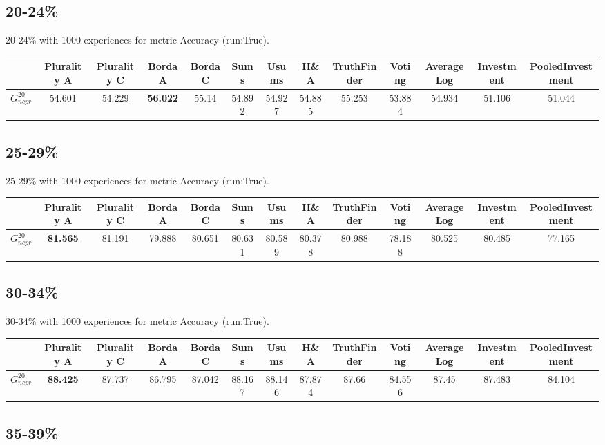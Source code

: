\documentclass{article}
\newcommand{\graph}[2]{$G_{#1}^{#2}$}
\begin{document}
\subsection{20-24\%}

20-24\% with 1000 experiences for metric Accuracy (run:True).

\noindent\begin{tabular}{|l|c|c|c|c|c|c|c|c|c|c|c|c|}
\hline
& Plurality A& Plurality C& Borda A& Borda C& Sums& Usums& H\&A& TruthFinder& Voting& AverageLog& Investment& PooledInvestment\\
\hline
\graph{ncpr}{20} &54.601&54.229&\textbf{56.022}&55.14&54.892&54.927&54.885&55.253&53.884&54.934&51.106&51.044\\
\hline
\end{tabular}
\newpage

\subsection{25-29\%}

25-29\% with 1000 experiences for metric Accuracy (run:True).

\noindent\begin{tabular}{|l|c|c|c|c|c|c|c|c|c|c|c|c|}
\hline
& Plurality A& Plurality C& Borda A& Borda C& Sums& Usums& H\&A& TruthFinder& Voting& AverageLog& Investment& PooledInvestment\\
\hline
\graph{ncpr}{20} &\textbf{81.565}&81.191&79.888&80.651&80.631&80.589&80.378&80.988&78.188&80.525&80.485&77.165\\
\hline
\end{tabular}
\newpage

\subsection{30-34\%}

30-34\% with 1000 experiences for metric Accuracy (run:True).

\noindent\begin{tabular}{|l|c|c|c|c|c|c|c|c|c|c|c|c|}
\hline
& Plurality A& Plurality C& Borda A& Borda C& Sums& Usums& H\&A& TruthFinder& Voting& AverageLog& Investment& PooledInvestment\\
\hline
\graph{ncpr}{20} &\textbf{88.425}&87.737&86.795&87.042&88.167&88.146&87.874&87.66&84.556&87.45&87.483&84.104\\
\hline
\end{tabular}
\newpage

\subsection{35-39\%}
\end{document}
